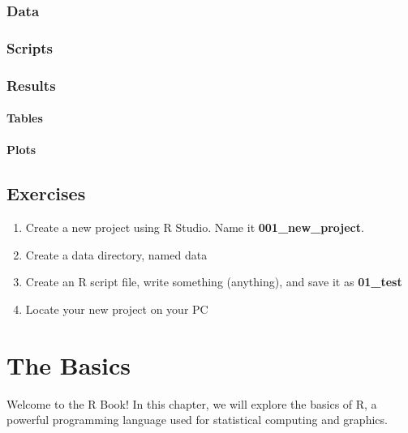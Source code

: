 \documentclass[
]{book}
\providecommand{\tightlist}{%
  \setlength{\itemsep}{0pt}\setlength{\parskip}{0pt}}
\begin{document}
\hypertarget{data}{%
\subsection{Data}\label{data}}

\hypertarget{scripts}{%
\subsection{Scripts}\label{scripts}}

\hypertarget{results}{%
\subsection{Results}\label{results}}

\hypertarget{tables}{%
\subsubsection{Tables}\label{tables}}

\hypertarget{plots}{%
\subsubsection{Plots}\label{plots}}

\hypertarget{exercises}{%
\section*{Exercises}\label{exercises}}

\begin{enumerate}
\def\labelenumi{\arabic{enumi}.}
\tightlist
\item
  Create a new project using R Studio. Name it \textbf{001\_new\_project}.
\item
  Create a data directory, named data
\item
  Create an R script file, write something (anything), and save it as \textbf{01\_test}
\item
  Locate your new project on your PC
\end{enumerate}

\hypertarget{the-basics}{%
\chapter{The Basics}\label{the-basics}}

Welcome to the R Book! In this chapter, we will explore the basics of R, a powerful programming language used for statistical computing and graphics.
\end{document}
